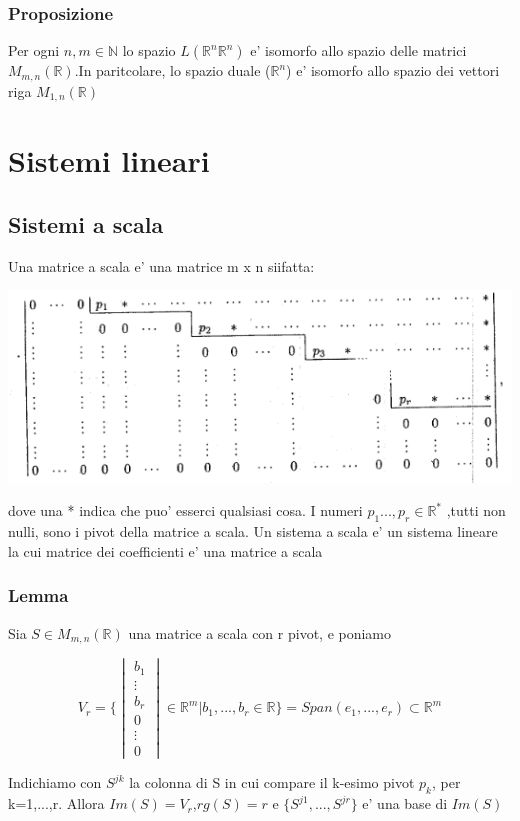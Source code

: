 \documentclass{article}
\begin{document}
\subsubsection{Proposizione}
\begin{flushleft}
	Per ogni $n,m \in \mathbb{N}$ lo spazio $L(\mathbb{R}^n\mathbb{R}^n)$ e' isomorfo allo spazio delle matrici $M_{m,n}(\mathbb{R})$.In paritcolare, lo spazio duale ($\mathbb{R}^n$) e' isomorfo allo spazio dei vettori riga $M_{1,n}(\mathbb{R})$
\end{flushleft}
\section{Sistemi lineari}
\subsection{Sistemi a scala}
\begin{flushleft}
	Una matrice a scala e' una matrice m x n siifatta:
\end{flushleft}
\includegraphics[bb=0 0 350 100]{sistema-scala.png}
\begin{flushleft}
	dove una * indica che puo' esserci qualsiasi cosa. I numeri $p_1...,p_r \in \mathbb{R}^*$
	,tutti non nulli, sono i pivot della matrice a scala. Un sistema a scala e' un sistema lineare
	la cui matrice dei coefficienti e' una matrice a scala
\end{flushleft}
\subsubsection{Lemma}
\begin{flushleft}
	Sia $S \in M_{m,n}(\mathbb{R})$ una matrice a scala con r pivot, e poniamo
\end{flushleft}
\begin{equation*}
	V_r=\{ \begin{vmatrix}
		b_1    \\
		\vdots \\
		b_r    \\
		0      \\
		\vdots \\
		0
	\end{vmatrix} \in \mathbb{R}^m | b_1,...,b_r \in \mathbb{R} \}= Span(e_1,...,e_r) \subset \mathbb{R}^m
\end{equation*}
\begin{flushleft}
	Indichiamo con $S^{jk}$ la colonna di S in cui compare il k-esimo pivot $p_k$, per k=1,...,r.
	Allora $Im(S)=V_r$,$rg(S)=r$ e $\{S^{j1},...,S^{jr} \}$ e' una base di $Im(S)$
\end{flushleft}
\end{document}
